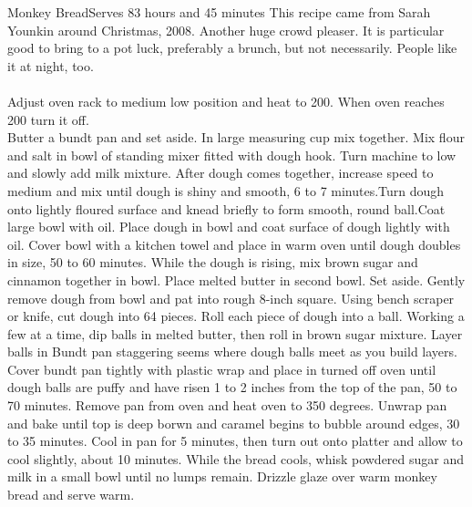 \begin{recipe}{Monkey Bread}{Serves 8}{3 hours and 45 minutes}
\freeform This recipe came from Sarah Younkin around Christmas, 2008.  Another huge crowd pleaser.  It is particular good to bring to a pot luck, preferably a brunch, but not necessarily.  People like it at night, too.\\\\
Adjust oven rack to medium low position and heat to 200\0.  When oven reaches 200\0 turn it off.\\
Butter a bundt pan and set aside.
In large measuring cup mix together.
Mix flour and salt in bowl of standing mixer fitted with dough hook.
\freeform
Turn machine to low and slowly add milk mixture.  After dough comes
together, increase speed to medium and mix until dough is shiny and
smooth, 6 to 7 minutes.Turn dough onto lightly floured surface and
knead briefly to form smooth, round ball.Coat large bowl with
oil. Place dough in bowl and coat surface of dough lightly with oil.
Cover bowl with a kitchen towel and place in warm oven until dough
doubles in size, 50 to 60 minutes.
While the dough is rising, mix brown sugar and cinnamon together in bowl. Place melted butter in second bowl. Set aside.
\freeform
Gently remove dough from bowl and pat into rough 8-inch square. Using
bench scraper or knife, cut dough into 64 pieces. Roll each piece of
dough into a ball. Working a few at a time, dip balls in melted
butter, then roll in brown sugar mixture. Layer balls in Bundt pan
staggering seems where dough balls meet as you build layers. Cover
bundt pan tightly with plastic wrap and place in turned off oven until
dough balls are puffy and have risen 1 to 2 inches from the top of the
pan, 50 to 70 minutes. Remove pan from oven and heat oven to 350
degrees. Unwrap pan and bake until top is deep borwn and caramel
begins to bubble around edges, 30 to 35 minutes. Cool in pan for 5
minutes, then turn out onto platter and allow to cool slightly, about
10 minutes.
While the bread cools, whisk powdered sugar and milk in a small bowl until no lumps remain. Drizzle glaze over warm monkey bread and serve warm. 
\end{recipe}

